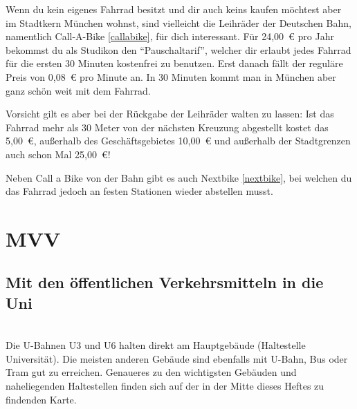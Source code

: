 Wenn du kein eigenes Fahrrad besitzt und dir auch keins kaufen möchtest aber im Stadtkern München wohnst, sind vielleicht die Leihräder der Deutschen Bahn, namentlich Call-A-Bike \ref{callabike}, für dich interessant. Für 24,00~€ pro Jahr bekommst du als Studikon den ``Pauschaltarif'', welcher dir erlaubt jedes Fahrrad für die ersten 30 Minuten kostenfrei zu benutzen. Erst danach fällt der reguläre Preis von 0,08~€ pro Minute an. In 30 Minuten kommt man in München aber ganz schön weit mit dem Fahrrad.

Vorsicht gilt es aber bei der Rückgabe der Leihräder walten zu lassen: Ist das Fahrrad mehr als 30 Meter von der nächsten Kreuzung abgestellt kostet das 5,00~€, außerhalb des Geschäftsgebietes 10,00~€ und außerhalb der Stadtgrenzen auch schon Mal 25,00~€!

Neben Call a Bike von der Bahn gibt es auch Nextbike \ref{nextbike}, bei welchen du das Fahrrad jedoch an festen Stationen wieder abstellen musst.

\begin{urlList}
\end{urlList}



\section{MVV}

\subsection*{Mit den öffentlichen Verkehrsmitteln in die Uni}\hfill\\
Die U-Bahnen U3 und U6 halten direkt am Hauptgebäude (Haltestelle Universität). Die meisten anderen Gebäude sind ebenfalls mit U-Bahn, Bus oder Tram gut zu erreichen. Genaueres zu den wichtigsten Gebäuden und naheliegenden Haltestellen finden sich auf der in der Mitte dieses Heftes zu findenden Karte.

